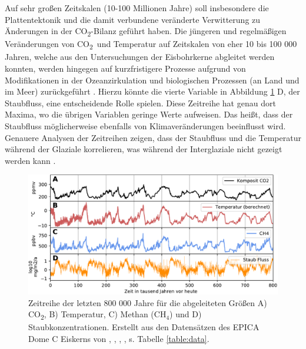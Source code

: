 \documentclass[12pt,a4paper,onecolumn]{scrartcl}
\newcommand{\cotwo}{CO\textsubscript{2}}
\begin{document}
Auf sehr großen Zeitskalen (10-100 Millionen Jahre) soll insbesondere die Plattentektonik und die damit verbundene veränderte Verwitterung zu Änderungen in der \cotwo -Bilanz geführt haben. Die jüngeren und regelmäßigen Veränderungen von \cotwo \ und Temperatur auf Zeitskalen von eher 10 bis 100 000 Jahren, welche aus den Untersuchungen der Eisbohrkerne abgleitet werden konnten, werden hingegen auf kurzfristigere Prozesse aufgrund von Modifikationen in der Ozeanzirkulation und biologischen Prozessen (an Land und im Meer) zurückgeführt \citep{Emerson.2009}. Hierzu könnte die vierte Variable in Abbildung \ref{fig:icecore} D, der Staubfluss, eine entscheidende Rolle spielen. Diese Zeitreihe hat genau dort Maxima, wo die übrigen Variablen geringe Werte aufweisen. Das heißt, dass der Staubfluss möglicherweise ebenfalls von Klimaveränderungen beeinflusst wird. Genauere Analysen der Zeitreihen zeigen, dass der Staubfluss und die Temperatur während der Glaziale korrelieren, was während der Interglaziale nicht gezeigt werden kann \citep{Lambert.2008}.
\begin{figure}[!htb]
\centering
\includegraphics[width=\textwidth]{bilder/epica_icecore.pdf}
\caption{Zeitreihe der letzten 800 000 Jahre für die abgeleiteten Größen A) \cotwo, B) Temperatur, C) Methan (CH$_4$) und D) Staubkonzentrationen. Erstellt aus den Datensätzen des EPICA Dome C Eiskerns von \cite{Jouzel.2007}, \cite{Lambert.2012}, \cite{Loulergue.2008}, \cite{Bereiter.2015}, s. Tabelle \ref{table:data}.}   \label{fig:icecore}
\end{figure}
\end{document}
